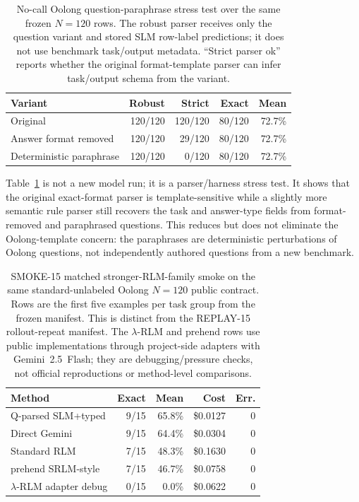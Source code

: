 \documentclass[letterpaper]{article}
\begin{document}
\begin{table}[t]
\centering
\small
\setlength{\tabcolsep}{2pt}
\begin{tabular}{@{}p{2.0cm}rrrr@{}}
\toprule
\textbf{Variant} & \textbf{Robust} & \textbf{Strict} & \textbf{Exact} & \textbf{Mean} \\
\midrule
Original & 120/120 & 120/120 & 80/120 & 72.7\% \\
Answer format removed & 120/120 & 29/120 & 80/120 & 72.7\% \\
Deterministic paraphrase & 120/120 & 0/120 & 80/120 & 72.7\% \\
\bottomrule
\end{tabular}
\caption{No-call Oolong question-paraphrase stress test over the same frozen $N=120$ rows. The robust parser receives only the question variant and stored SLM row-label predictions; it does not use benchmark task/output metadata. ``Strict parser ok'' reports whether the original format-template parser can infer task/output schema from the variant.}
\label{tab:supp-oolong-question-stress}
\end{table}

Table~\ref{tab:supp-oolong-question-stress} is not a new model run; it is a parser/harness stress test. It shows that the original exact-format parser is template-sensitive while a slightly more semantic rule parser still recovers the task and answer-type fields from format-removed and paraphrased questions. This reduces but does not eliminate the Oolong-template concern: the paraphrases are deterministic perturbations of Oolong questions, not independently authored questions from a new benchmark.

\begin{table}[t]
\centering
\small
\setlength{\tabcolsep}{3pt}
\begin{tabular}{@{}lrrrr@{}}
\toprule
\textbf{Method} & \textbf{Exact} & \textbf{Mean} & \textbf{Cost} & \textbf{Err.} \\
\midrule
Q-parsed SLM+typed & 9/15 & 65.8\% & \$0.0127 & 0 \\
Direct Gemini & 9/15 & 64.4\% & \$0.0304 & 0 \\
Standard RLM & 7/15 & 48.3\% & \$0.1630 & 0 \\
prehend SRLM-style & 7/15 & 46.7\% & \$0.0758 & 0 \\
$\lambda$-RLM adapter debug & 0/15 & 0.0\% & \$0.0622 & 0 \\
\bottomrule
\end{tabular}
\caption{SMOKE-15 matched stronger-RLM-family smoke on the same standard-unlabeled Oolong $N{=}120$ public contract. Rows are the first five examples per task group from the frozen manifest. This is distinct from the REPLAY-15 rollout-repeat manifest. The $\lambda$-RLM and prehend rows use public implementations through project-side adapters with Gemini~2.5~Flash; they are debugging/pressure checks, not official reproductions or method-level comparisons.}
\label{tab:supp-oolong-standard-family-smoke}
\end{table}
\end{document}
